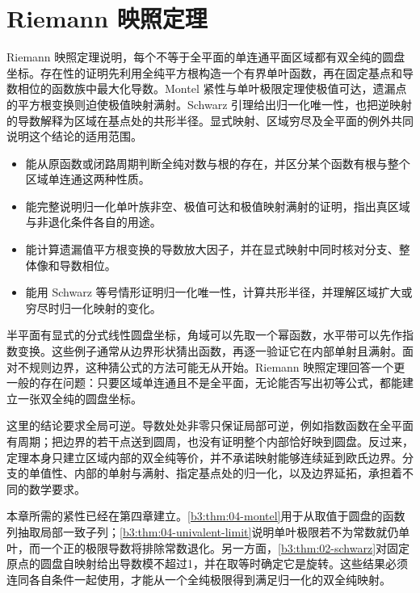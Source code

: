 \chapter{Riemann 映照定理}
\label{b3:ch:05}
\begin{chapterabstract}
Riemann 映照定理说明，每个不等于全平面的单连通平面区域都有双全纯的圆盘坐标。存在性的证明先利用全纯平方根构造一个有界单叶函数，再在固定基点和导数相位的函数族中最大化导数。Montel 紧性与单叶极限定理使极值可达，遗漏点的平方根变换则迫使极值映射满射。Schwarz 引理给出归一化唯一性，也把逆映射的导数解释为区域在基点处的共形半径。显式映射、区域穷尽及全平面的例外共同说明这个结论的适用范围。
\end{chapterabstract}

\begin{learninggoals}
\begin{itemize}
\item\label{b3:item:05-goal-1}能从原函数或闭路周期判断全纯对数与根的存在，并区分某个函数有根与整个区域单连通这两种性质。
\item\label{b3:item:05-goal-2}能完整说明归一化单叶族非空、极值可达和极值映射满射的证明，指出真区域与非退化条件各自的用途。
\item\label{b3:item:05-goal-3}能计算遗漏值平方根变换的导数放大因子，并在显式映射中同时核对分支、整体像和导数相位。
\item\label{b3:item:05-goal-4}能用 Schwarz 等号情形证明归一化唯一性，计算共形半径，并理解区域扩大或穷尽时归一化映射的变化。
\end{itemize}
\end{learninggoals}

半平面有显式的分式线性圆盘坐标，角域可以先取一个幂函数，水平带可以先作指数变换。这些例子通常从边界形状猜出函数，再逐一验证它在内部单射且满射。面对不规则边界，这种猜公式的方法可能无从开始。Riemann 映照定理回答一个更一般的存在问题：只要区域单连通且不是全平面，无论能否写出初等公式，都能建立一张双全纯的圆盘坐标。

\ProseParagraphBreak

这里的结论要求全局可逆。导数处处非零只保证局部可逆，例如指数函数在全平面有周期；把边界的若干点送到圆周，也没有证明整个内部恰好映到圆盘。反过来，定理本身只建立区域内部的双全纯等价，并不承诺映射能够连续延到欧氏边界。分支的单值性、内部的单射与满射、指定基点处的归一化，以及边界延拓，承担着不同的数学要求。

\ProseParagraphBreak

本章所需的紧性已经在第四章建立。\cref{b3:thm:04-montel}用于从取值于圆盘的函数列抽取局部一致子列；\cref{b3:thm:04-univalent-limit}说明单叶极限若不为常数就仍单叶，而一个正的极限导数将排除常数退化。另一方面，\cref{b3:thm:02-schwarz}对固定原点的圆盘自映射给出导数模不超过1，并在取等时确定它是旋转。这些结果必须连同各自条件一起使用，才能从一个全纯极限得到满足归一化的双全纯映射。

